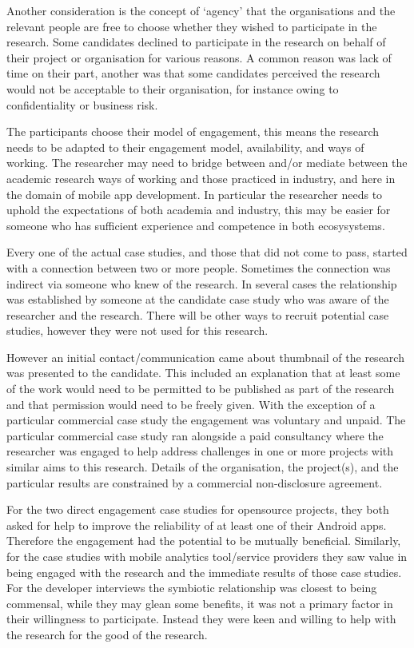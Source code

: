 Another consideration is the concept of `agency' that the organisations and the relevant people are free to choose whether they wished to participate in the research. Some candidates declined to participate in the research on behalf of their project or organisation for various reasons. A common reason was lack of time on their part, another was that some candidates perceived the research would not be acceptable to their organisation, for instance owing to confidentiality or business risk.

The participants choose their model of engagement, this means the research needs to be adapted to their engagement model, availability, and ways of working. The researcher may need to bridge between and/or mediate between the academic research ways of working and those practiced in industry, and here in the domain of mobile app development. In particular the researcher needs to uphold the expectations of both academia and industry, this may be easier for someone who has sufficient experience and competence in both ecosysystems.

Every one of the actual case studies, and those that did not come to pass, started with a connection between two or more people. Sometimes the connection was indirect via someone who knew of the research. In several cases the relationship was established by someone at the candidate case study who was aware of the researcher and the research. There will be other ways to recruit potential case studies, however they were not used for this research.

However an initial contact/communication came about thumbnail of the research was presented to the candidate. This included an explanation that at least some of the work would need to be permitted to be published as part of the research and that permission would need to be freely given. With the exception of a particular commercial case study the engagement was voluntary and unpaid. The particular commercial case study ran alongside a paid consultancy where the researcher was engaged to help address challenges in one or more projects with similar aims to this research. Details of the organisation, the project(s), and the particular results are constrained by a commercial non-disclosure agreement.

For the two direct engagement case studies for opensource projects, they both asked for help to improve the reliability of at least one of their Android apps. Therefore the engagement had the potential to be mutually beneficial. Similarly, for the case studies with mobile analytics tool/service providers they saw value in being engaged with the research and the immediate results of those case studies. For the developer interviews the symbiotic relationship was closest to being commensal, while they may glean some benefits, it was not a primary factor in their willingness to participate. Instead they were keen and willing to help with the research for the good of the research. 



